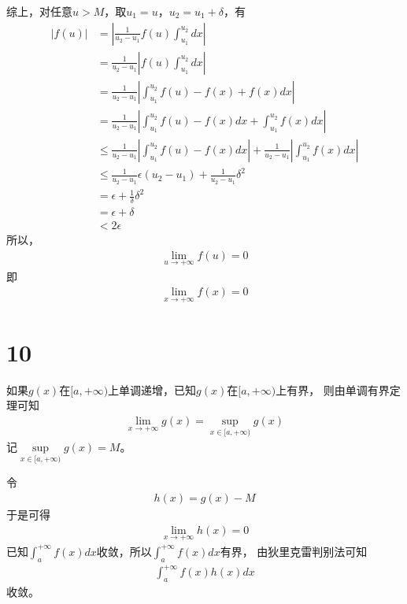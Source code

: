 \documentclass{article}
\begin{document}
综上，对任意$u > M$，取$u_1 = u$，$u_2 = u_1 + \delta$，有
\begin{align*}
  |f(u)| & = \left|\frac{1}{u_2 - u_1} f(u) \int_{u_1}^{u_2} dx \right|                                                                       \\
         & = \frac{1}{u_2 - u_1} \left| f(u) \int_{u_1}^{u_2} dx \right|                                                                      \\
         & = \frac{1}{u_2 - u_1} \left|\int_{u_1}^{u_2} f(u) - f(x) + f(x) dx \right|                                                         \\
         & = \frac{1}{u_2 - u_1} \left|\int_{u_1}^{u_2} f(u) - f(x) dx + \int_{u_1}^{u_2} f(x) dx \right|                                     \\
         & \leq \frac{1}{u_2 - u_1} \left|\int_{u_1}^{u_2} f(u) - f(x) dx \right| + \frac{1}{u_2 - u_1} \left|\int_{u_1}^{u_2}f(x) dx \right| \\
         & \leq \frac{1}{u_2 - u_1} \epsilon (u_2 - u_1) + \frac{1}{u_2 - u_1} \delta^2                                                       \\
         & = \epsilon + \frac{1}{\delta} \delta^2                                                                                             \\
         & = \epsilon + \delta                                                                                                                \\
         & < 2\epsilon
\end{align*}
所以，
\begin{align*}
  \lim \limits_{u \to +\infty} f(u) = 0
\end{align*}
即
\begin{align*}
  \lim \limits_{x \to +\infty} f(x) = 0
\end{align*}

\section*{10}

如果$g(x)$在$[a, +\infty)$上单调递增，已知$g(x)$在$[a, +\infty)$上有界，
则由单调有界定理可知
\begin{align*}
  \lim \limits_{x \to +\infty} g(x) = \sup\limits_{x \in [a, +\infty)} g(x)
\end{align*}
记$\sup\limits_{x \in [a, +\infty)} g(x) = M$。

令
\begin{align*}
  h(x) = g(x) - M
\end{align*}
于是可得
\begin{align*}
  \lim \limits_{x \to +\infty} h(x) = 0
\end{align*}
已知$\int_{a}^{+\infty} f(x) dx$收敛，所以$\int_{a}^{+\infty} f(x) dx$有界，
由狄里克雷判别法可知
\begin{align*}
  \int_{a}^{+\infty} f(x) h(x) dx
\end{align*}
收敛。
\end{document}
